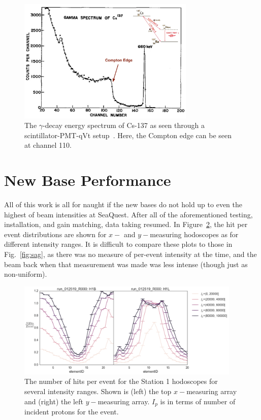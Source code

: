 \begin{figure}
	\centerline{
		\mbox{\includegraphics[width=0.75\textwidth]{figures/pmtupgrade/cs-137.pdf}}
	}
	\caption{The $\gamma$-decay energy spectrum of Cs-137 as seen through a scintillator-PMT-qVt setup~\cite{Webb_Williams_1963}. Here, the Compton edge can be seen at channel 110.}
	\label{fig:cs-137}
\end{figure}

\section{New Base Performance}

All of this work is all for naught if the new bases do not hold up to even the highest of beam intensities at SeaQuest. After all of the aforementioned testing, installation, and gain matching, data taking resumed. In Figure~\ref{fig:pmt-high-int}, the hit per event distributions are shown for $x-$ and $y-$measuring hodoscopes as for different intensity ranges. It is difficult to compare these plots to those in Fig.~\ref{fig:sag}, as there was no measure of per-event intensity at the time, and the beam back when that measurement was made was less intense (though just as non-uniform). 
\begin{figure}
	\centering
	\includegraphics[width=0.95\textwidth]{figures/pmtupgrade/final_pmt_dist_vs_int.png}
	\caption{The number of hits per event for the Station 1 hodoscopes for several intensity ranges. Shown is (left) the top $x-$measuring array and (right) the left $y-$measuring array. $I_p$ is in terms of number of incident protons for the event.}
	\label{fig:pmt-high-int}
\end{figure}

